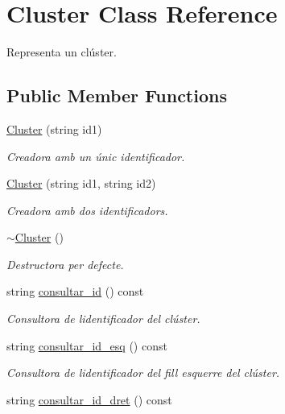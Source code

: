 \hypertarget{class_cluster}{}\section{Cluster Class Reference}
\label{class_cluster}


Representa un clúster.  


\subsection*{Public Member Functions}
\begin{DoxyCompactItemize}
\item 
\hyperlink{class_cluster_ac81cfcf15eac35bd1c3d8802ec044a5f}{Cluster} (string id1)
\begin{DoxyCompactList}\small\item\em Creadora amb un únic identificador. \end{DoxyCompactList}\item 
\hyperlink{class_cluster_a3a657a86432eb76d41831b44a94e99d0}{Cluster} (string id1, string id2)
\begin{DoxyCompactList}\small\item\em Creadora amb dos identificadors. \end{DoxyCompactList}\item 
\hyperlink{class_cluster_a4bddfc88ac859610acab15dd12851b58}{$\sim$\+Cluster} ()
\begin{DoxyCompactList}\small\item\em Destructora per defecte. \end{DoxyCompactList}\item 
string \hyperlink{class_cluster_a040da4a393c7fcb8ac7edbe5b82679cf}{consultar\+\_\+id} () const
\begin{DoxyCompactList}\small\item\em Consultora de l\textquotesingle{}identificador del clúster. \end{DoxyCompactList}\item 
string \hyperlink{class_cluster_ab9281dd9b122de1d367f8c01bad027dd}{consultar\+\_\+id\+\_\+esq} () const
\begin{DoxyCompactList}\small\item\em Consultora de l\textquotesingle{}identificador del fill esquerre del clúster. \end{DoxyCompactList}\item 
string \hyperlink{class_cluster_a52cb76611eb859cf14f8ad3bba54d994}{consultar\+\_\+id\+\_\+dret} () const

\end{DoxyCompactItemize}
